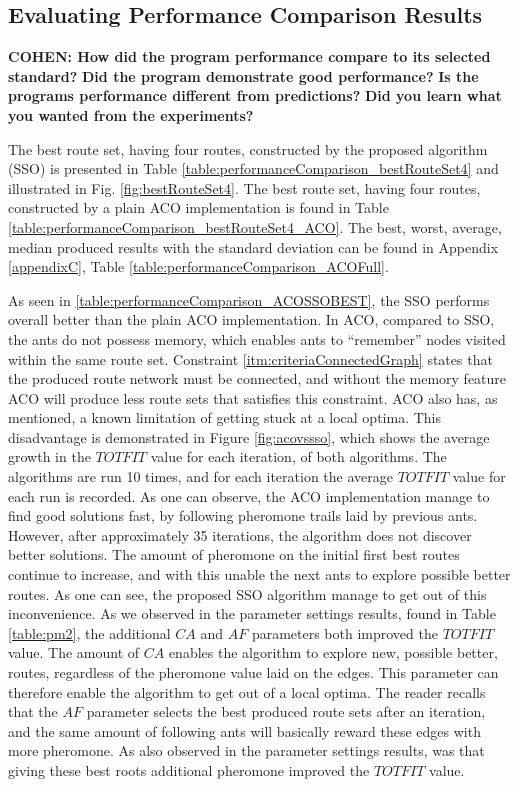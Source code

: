 \subsection{Evaluating Performance Comparison Results}

\textbf{COHEN: How did the program performance compare to its selected standard?} 
\textbf{Did the program demonstrate good performance?}
\textbf{Is the programs performance different from predictions?} 
\textbf{Did you learn what you wanted from the experiments?}

The best route set, having four routes, constructed by the proposed algorithm (SSO) is presented in Table \vref{table:performanceComparison_bestRouteSet4} and illustrated in Fig. \vref{fig:bestRouteSet4}. The best route set, having four routes, constructed by a plain ACO implementation is found in Table \vref{table:performanceComparison_bestRouteSet4_ACO}. The best, worst, average, median produced results with the standard deviation can be found in Appendix \ref{appendixC}, Table \vref{table:performanceComparison_ACOFull}. 

As seen in \vref{table:performanceComparison_ACOSSOBEST}, the SSO performs overall better than the plain ACO implementation. In ACO, compared to SSO, the ants do not possess memory, which enables ants to ``remember'' nodes visited within the same route set. Constraint \vref{itm:criteriaConnectedGraph} states that the produced route network must be connected, and without the memory feature ACO will produce less route sets that satisfies this constraint.  ACO also has, as mentioned, a known limitation of getting stuck at a local optima. This disadvantage is demonstrated in Figure \ref{fig:acovssso}, which shows the average growth in the $TOTFIT$ value for each iteration, of both algorithms. The algorithms are run 10 times, and for each iteration the average $TOTFIT$ value for each run is recorded. As one can observe, the ACO implementation manage to find good solutions fast, by following pheromone trails laid by previous ants. However, after approximately 35 iterations, the algorithm does not discover better solutions. The amount of pheromone on the initial first best routes continue to increase, and with this unable the next ants to explore possible better routes. As one can see, the proposed SSO algorithm manage to get out of this inconvenience. As we observed in the parameter settings results, found in Table \vref{table:pm2}, the additional $CA$ and $AF$ parameters both improved the $TOTFIT$ value. The amount of $CA$ enables the algorithm to explore new, possible better, routes, regardless of the pheromone value laid on the edges. This parameter can therefore enable the algorithm to get out of a local optima. The reader recalls that the $AF$ parameter selects the best produced route sets after an iteration, and the same amount of following ants will basically reward these edges with more pheromone. As also observed in the parameter settings results, was that giving these best roots additional pheromone improved the $TOTFIT$ value. 

